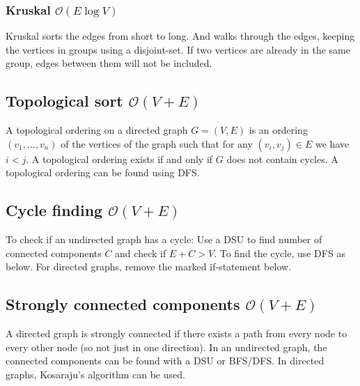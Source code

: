 \subsubsection{Kruskal $\mathcal O(E\log V)$}
Kruskal sorts the edges from short to long. And walks through the edges, keeping the vertices in groups using a disjoint-set. If two vertices are already in the same group, edges between them will not be included.



\subsection{Topological sort $\mathcal O(V + E)$}

A topological ordering on a directed graph $G = (V, E)$ is an ordering $(v_1, \dots, v_n)$ of the vertices of the graph such that for any $(v_i, v_j) \in E$ we have $i < j$. A topological ordering exists if and only if $G$ does not contain cycles. A topological ordering can be found using DFS.



\subsection{Cycle finding $\mathcal O(V + E)$}

To check if an undirected graph has a cycle: Use a DSU to find number of connected components $C$ and check if $E + C > V$. To find the cycle, use DFS as below. For directed graphs, remove the marked if-statement below.




\subsection{Strongly connected components $\mathcal O(V + E)$}
A directed graph is strongly connected if there exists a path from every node to every other node (so not just in one direction). In an undirected graph, the connected components can be found with a DSU or BFS/DFS. In directed graphs, Kosaraju's algorithm can be used.


